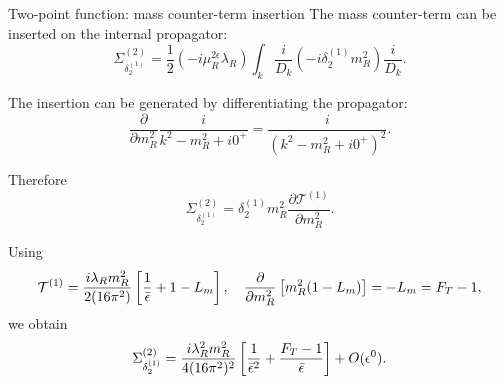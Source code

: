 \documentclass[aspectratio=169,10pt]{beamer}
\begin{document}
\begin{frame}{Two-point function: mass counter-term insertion}
\small
The mass counter-term can be inserted on the internal propagator:
\begin{equation}
\Sigma_{\delta_2^{(1)}}^{(2)}
=
\frac12
(-i\mu_R^{2\epsilon}\lambda_R)
\int_k
\frac{i}{D_k}
\left(
-i\delta_2^{(1)}m_R^2
\right)
\frac{i}{D_k}.
\end{equation}

The insertion can be generated by differentiating the propagator:
\begin{equation}
\frac{\partial}{\partial m_R^2}
\frac{i}{k^2-m_R^2+i0^+}
=
\frac{i}{(k^2-m_R^2+i0^+)^2}.
\end{equation}

Therefore
\begin{equation}
\Sigma_{\delta_2^{(1)}}^{(2)}
=
\delta_2^{(1)}m_R^2
\frac{\partial\mathcal T^{(1)}}
{\partial m_R^2}.
\end{equation}

Using
\begin{equation}
\mathcal T^{(1)}
=
\frac{i\lambda_Rm_R^2}{2(16\pi^2)}
\left[
\frac1{\bar\epsilon}
+
1-L_m
\right],\quad 
\frac{\partial}{\partial m_R^2}
\left[
m_R^2(1-L_m)
\right]
=
-L_m
=
F_T-1,
\end{equation}
we obtain
\begin{equation}
\Sigma_{\delta_2^{(1)}}^{(2)}
=
\frac{i\lambda_R^2m_R^2}
{4(16\pi^2)^2}
\left[
\frac1{\bar\epsilon^2}
+
\frac{F_T-1}{\bar\epsilon}
\right]
+
O(\epsilon^0).
\end{equation}


\end{frame}
\end{document}
